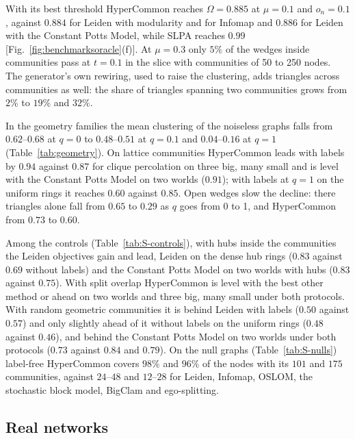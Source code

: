 With its best threshold HyperCommon reaches $\Omega=0.885$ at $\mu=0.1$ and $o_n=0.1$,
against $0.884$ for Leiden with modularity and for Infomap and $0.886$ for Leiden with
the Constant Potts Model, while SLPA reaches $0.99$ [Fig.~\ref{fig:benchmarksoracle}(f)].
At $\mu=0.3$ only $5\%$ of the wedges inside communities pass at $t=0.1$ in the slice with
communities of 50 to 250 nodes. The generator's own rewiring, used to raise the
clustering, adds triangles across communities as well: the share of triangles spanning
two communities grows from $2\%$ to $19\%$ and $32\%$.

In the geometry families the mean clustering of the noiseless graphs falls from
$0.62$--$0.68$ at $q=0$ to $0.48$--$0.51$ at $q=0.1$ and $0.04$--$0.16$ at $q=1$
(Table~\ref{tab:geometry}). On lattice communities HyperCommon leads with labels by
$0.94$ against $0.87$ for clique percolation on three big, many small and is level with
the Constant Potts Model on two worlds ($0.91$); with labels at $q=1$ on the uniform rings
it reaches $0.60$ against $0.85$. Open wedges slow the decline: there triangles alone fall
from $0.65$ to $0.29$ as $q$ goes from 0 to 1, and HyperCommon from $0.73$ to $0.60$.

Among the controls (Table~\ref{tab:S-controls}), with hubs inside the communities the
Leiden objectives gain and lead, Leiden on the dense hub rings ($0.83$ against $0.69$
without labels) and the Constant Potts Model on two worlds with hubs ($0.83$ against
$0.75$). With split overlap HyperCommon is level with the best other method or ahead on
two worlds and three big, many small under both protocols. With random geometric
communities it is behind Leiden with labels ($0.50$ against $0.57$) and only slightly
ahead of it without labels on the uniform rings ($0.48$ against $0.46$), and behind the
Constant Potts Model on two worlds under both protocols ($0.73$ against $0.84$ and
$0.79$). On the null graphs (Table~\ref{tab:S-nulls}) label-free HyperCommon covers
$98\%$ and $96\%$ of the nodes with its $101$ and $175$ communities, against $24$--$48$
and $12$--$28$ for Leiden, Infomap, OSLOM, the stochastic block model, BigClam and
ego-splitting.

\subsection*{Real networks}

